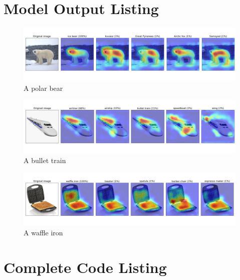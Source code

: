 \documentclass{article}
\begin{document}
\begin{appendices}

\newpage
\section{Model Output Listing} \label{modelouts}
\begin{figure}[H]
    \centering
    \includegraphics[width=6in]{csci-8110/hw-2/images/bear_output.png}
    \caption{A polar bear}
    \label{fig:bear}
\end{figure}
\begin{figure}[H]
    \centering
    \includegraphics[width=6in]{csci-8110/hw-2/images/bullet_train_output.png}
    \caption{A bullet train}
    \label{fig:train}
\end{figure}
\begin{figure}[H]
    \centering
    \includegraphics[width=6in]{csci-8110/hw-2/images/waffle_iron_output.png}
    \caption{A waffle iron}
    \label{fig:waffle}
\end{figure}
\newpage
\section{Complete Code Listing} \label{codelist}

\end{appendices}



\end{document}
